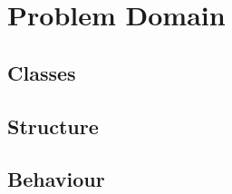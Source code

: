 \chapter{Problem Domain}

\section{Classes}
\label{sub:pd_classes}


\section{Structure}


\section{Behaviour}

